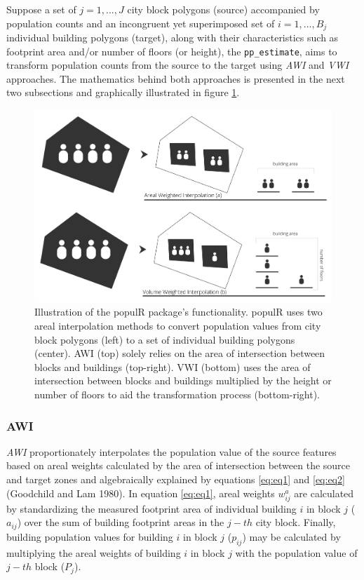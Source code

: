 Suppose a set of \(j = 1, ..., J\) city block polygons (source) accompanied by population counts and an incongruent yet superimposed set of \(i = 1, ..., B_j\) individual building polygons (target), along with their characteristics such as footprint area and/or number of floors (or height), the \texttt{pp\_estimate}, aims to transform population counts from the source to the target using \emph{AWI} and \emph{VWI} approaches. The mathematics behind both approaches is presented in the next two subsections and graphically illustrated in figure \ref{fig:methods}.

\begin{figure}
\includegraphics[width=1\linewidth]{img/methods} \caption{Illustration of the populR package's functionality. populR uses two areal interpolation methods to convert population values from city block polygons (left) to a set of individual building polygons (center). AWI (top) solely relies on the area of intersection between blocks and buildings (top-right). VWI (bottom) uses the area of intersection between blocks and buildings multiplied by the height or number of floors to aid the transformation process (bottom-right).}\label{fig:methods}
\end{figure}

\hypertarget{awi}{%
\subsubsection{AWI}\label{awi}}

\emph{AWI} proportionately interpolates the population value of the source features based on areal weights calculated by the area of intersection between the source and target zones and algebraically explained by equations \eqref{eq:eq1} and \eqref{eq:eq2} (Goodchild and Lam 1980). In equation \eqref{eq:eq1}, areal weights \(w^a_{ij}\) are calculated by standardizing the measured footprint area of individual building \(i\) in block \(j\) (\(a_{ij}\)) over the sum of building footprint areas in the \(j-th\) city block. Finally, building population values for building \(i\) in block \(j\) (\(p_{ij}\)) may be calculated by multiplying the areal weights of building \(i\) in block \(j\) with the population value of \(j-th\) block (\(P_j\)).

